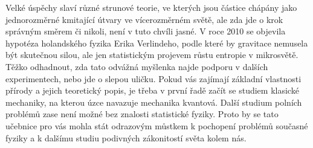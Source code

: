     Velké úspěchy slaví různé strunové teorie, ve kterých jsou částice chápány jako jednorozměrné kmitající útvary ve vícerozměrném světě, ale zda jde o krok správným směrem či nikoli, není v tuto chvíli jasné. V roce 2010 se objevila hypotéza holandského
    fyzika Erika Verlindeho, podle které by gravitace nemusela být skutečnou silou, ale jen
    statistickým projevem růstu entropie v mikrosvětě. Těžko odhadnout, zda tato odvážná
    myšlenka najde podporu v dalších experimentech, nebo jde o slepou uličku.
    Pokud vás zajímají základní vlastnosti přírody a jejich teoretický popis, je třeba v první řadě začít se studiem klasické mechaniky, na kterou úzce navazuje mechanika kvantová. Další studium polních problémů zase není možné bez znalosti statistické fyziky.
    Proto by se tato učebnice pro vás mohla stát odrazovým můstkem k pochopení problémů současné fyziky a k dalšímu studiu podivných zákonitostí světa kolem nás. 
